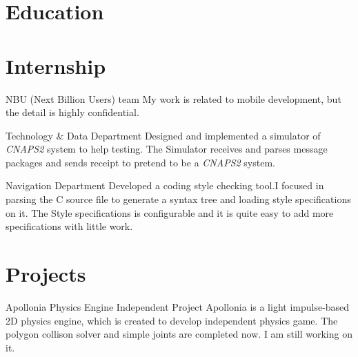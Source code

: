 \documentclass[11pt,a4paper]{moderncv}
\begin{document}
\makecvtitle

\section{Education}


\section{Internship}
{NBU (Next Billion Users) team}
{}{}{
	My work is related to mobile development, but the detail is highly confidential.
}

{Technology \& Data Department}
{}{}{
	Designed and implemented a simulator of \textsl{CNAPS2} system to help testing.
	The Simulator receives and parses message packages and sends receipt
	to pretend to be a \textsl{CNAPS2} system.
}

{Navigation Department}
{}{}{
	Developed a coding style checking tool.I focused in parsing the C source file to generate a
	syntax tree and loading style specifications on it. The Style specifications is configurable
	and it is quite easy to add more specifications with little work.
}

\section{Projects}

{Apollonia}
{Physics Engine}
{Independent Project}{}{
	Apollonia is a light impulse-based 2D physics engine, which is created to develop independent physics game. The polygon collison solver and simple joints are completed now. I am still working on it.
}
\end{document}
